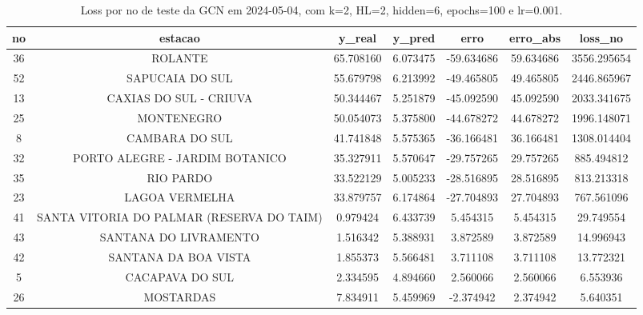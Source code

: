 \begin{table}[h]
\centering
\caption{Loss por no de teste da GCN em 2024-05-04, com k=2, HL=2, hidden=6, epochs=100 e lr=0.001.}
\label{tab:gcn_loss_k2_hl2_h6_e100_d20240504}
\begin{tabular}{ccccccc}
\toprule
no & estacao & y\_real & y\_pred & erro & erro\_abs & loss\_no \\
\midrule
36 & ROLANTE & 65.708160 & 6.073475 & -59.634686 & 59.634686 & 3556.295654 \\
52 & SAPUCAIA DO SUL & 55.679798 & 6.213992 & -49.465805 & 49.465805 & 2446.865967 \\
13 & CAXIAS DO SUL - CRIUVA & 50.344467 & 5.251879 & -45.092590 & 45.092590 & 2033.341675 \\
25 & MONTENEGRO & 50.054073 & 5.375800 & -44.678272 & 44.678272 & 1996.148071 \\
8 & CAMBARA DO SUL & 41.741848 & 5.575365 & -36.166481 & 36.166481 & 1308.014404 \\
32 & PORTO ALEGRE - JARDIM BOTANICO & 35.327911 & 5.570647 & -29.757265 & 29.757265 & 885.494812 \\
35 & RIO PARDO & 33.522129 & 5.005233 & -28.516895 & 28.516895 & 813.213318 \\
23 & LAGOA VERMELHA & 33.879757 & 6.174864 & -27.704893 & 27.704893 & 767.561096 \\
41 & SANTA VITORIA DO PALMAR (RESERVA DO TAIM) & 0.979424 & 6.433739 & 5.454315 & 5.454315 & 29.749554 \\
43 & SANTANA DO LIVRAMENTO & 1.516342 & 5.388931 & 3.872589 & 3.872589 & 14.996943 \\
42 & SANTANA DA BOA VISTA & 1.855373 & 5.566481 & 3.711108 & 3.711108 & 13.772321 \\
5 & CACAPAVA DO SUL & 2.334595 & 4.894660 & 2.560066 & 2.560066 & 6.553936 \\
26 & MOSTARDAS & 7.834911 & 5.459969 & -2.374942 & 2.374942 & 5.640351 \\
\bottomrule
\end{tabular}
\end{table}
